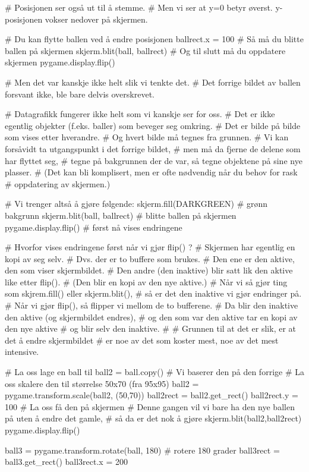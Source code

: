 # Posisjonen ser også ut til å stemme.
# Men vi ser at y=0 betyr øverst. y-posisjonen vokser nedover på skjermen. 


# Du kan flytte ballen ved å endre posisjonen
ballrect.x = 100
# Så må du blitte ballen på skjermen 
skjerm.blit(ball, ballrect)
# Og til slutt må du oppdatere skjermen 
pygame.display.flip()

# Men det var kanskje ikke helt slik vi tenkte det.
# Det forrige bildet av ballen forsvant ikke, ble bare delvis overskrevet.

# Datagrafikk fungerer ikke helt som vi kanskje ser for oss. 
# Det er ikke egentlig objekter (f.eks. baller) som beveger seg omkring. 
# Det er bilde på bilde som vises etter hverandre. 
# Og hvert bilde må tegnes fra grunnen.
# Vi kan forsåvidt ta utgangspunkt i det forrige bildet,
# men må da fjerne de delene som har flyttet seg,
# tegne på bakgrunnen der de var, så tegne objektene på sine nye plasser.
# (Det kan bli komplisert, men er ofte nødvendig når du behov for rask
# oppdatering av skjermen.)

# Vi trenger altså å gjøre følgende:
skjerm.fill(DARKGREEN)       # grønn bakgrunn
skjerm.blit(ball, ballrect)  # blitte ballen på skjermen
pygame.display.flip()        # først nå vises endringene

# Hvorfor vises endringene først når vi gjør flip() ?
# Skjermen har egentlig en kopi av seg selv.
# Dvs. der er to buffere som brukes.
# Den ene er den aktive, den som viser skjermbildet.
# Den andre (den inaktive) blir satt lik den aktive like etter flip().
# (Den blir en kopi av den nye aktive.) 
# Når vi så gjør ting som skjrem.fill() eller skjerm.blit(),
# så er det den inaktive vi gjør endringer på.
# Når vi gjør flip(), så flipper vi mellom de to bufferene. 
# Da blir den inaktive den aktive (og skjermbildet endres), 
# og den som var den aktive tar en kopi av den nye aktive
# og blir selv den inaktive.
# 
# Grunnen til at det er slik, er at det å endre skjermbildet
# er noe av det som koster mest, noe av det mest intensive. 


# La oss lage en ball til 
ball2 = ball.copy()  # Vi baserer den på den forrige
# La oss skalere den til størrelse 50x70 (fra 95x95)
ball2 = pygame.transform.scale(ball2, (50,70))
ball2rect = ball2.get_rect()
ball2rect.y = 100
# La oss få den på skjermen
# Denne gangen vil vi bare ha den nye ballen på uten å endre det gamle,
# så da er det nok å gjøre
skjerm.blit(ball2,ball2rect)
pygame.display.flip()


ball3 = pygame.transform.rotate(ball, 180)  # rotere 180 grader
ball3rect = ball3.get_rect()
ball3rect.x = 200

